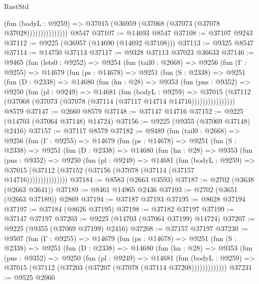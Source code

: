 \begin{lexlean}{RustStd}
\begin{coremodule}
                        (fun (bodyL : @9259) =>
                        @37015 (@36959 (@37068 (@37073 (@37078 @37028)))))))))))))))
    @8547
@37107 := @14693 @8547
@37108 := @37107 @9243
@37112 := @9225 (@36957 (@14690 (@14692 @37108)))
@37113 := @9325 @8547
@37114 := @14750 @37113
@37117 := @9328 @37113 @37023 @36633
@37146 := @9465
    (fun (lets0 : @9252) =>
    @9254
      (fun (tail0 : @2668) =>
      @9256
        (fun (Γ : @9255) =>
        @14679
          (fun (ps : @14678) =>
          @9251
            (fun (S : @2338) =>
            @9251
              (fun (D : @2338) =>
              @14680
                (fun (hn : @28) =>
                @9353
                  (fun (pns : @9352) =>
                  @9250
                    (fun (pl : @9249) =>
                    @14681
                      (fun (bodyL : @9259) =>
                      @37015
                        (@37112
                          (@37068 (@37073 (@37078 (@37114 (@37117 @14714 @14716))))))))))))))))
    @8579
@37147 := @2660 @8579
@37148 := @37147 @14716
@37152 := @9225 (@14703 (@37064 @37148) @14724)
@37156 := @9225 (@9355 (@37069 @37148) @2416)
@37157 := @37117 @8579
@37182 := @9489
    (fun (tail0 : @2668) =>
    @9256
      (fun (Γ : @9255) =>
      @14679
        (fun (ps : @14678) =>
        @9251
          (fun (S : @2338) =>
          @9251
            (fun (D : @2338) =>
            @14680
              (fun (hn : @28) =>
              @9353
                (fun (pns : @9352) =>
                @9250
                  (fun (pl : @9249) =>
                  @14681
                    (fun (bodyL : @9259) =>
                    @37015 (@37112 (@37152 (@37156 (@37078 (@37114 (@37157 @14716)))))))))))))))
@37184 := @8583 (@2663 @3593)
@37187 := @2702 (@3638 (@2663 @3641))
@37189 := @8461 @14965 @2436
@37193 := @2702 (@3651 (@2663 @37189)) @2869
@37194 := @37187 @37193
@37195 := @8628 @37194
@37197 := @37184 (@8626 @37195)
@37198 := @37182 @37197
@37199 := @37147 @37197
@37203 := @9225 (@14703 (@37064 @37199) @14724)
@37207 := @9225 (@9355 (@37069 @37199) @2416)
@37208 := @37157 @37197
@37230 := @9507
    (fun (Γ : @9255) =>
    @14679
      (fun (ps : @14678) =>
      @9251
        (fun (S : @2338) =>
        @9251
          (fun (D : @2338) =>
          @14680
            (fun (hn : @28) =>
            @9353
              (fun (pns : @9352) =>
              @9250
                (fun (pl : @9249) =>
                @14681
                  (fun (bodyL : @9259) =>
                  @37015 (@37112 (@37203 (@37207 (@37078 (@37114 @37208)))))))))))))
@37231 := @9525 @2060

\end{coremodule}
\end{lexlean}
